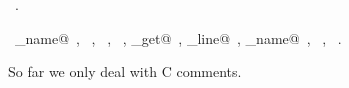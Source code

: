 \documentclass[a4paper]{report}
\begin{document}
\begin{flushleft}
\begin{minipage}{\linewidth}
\begin{list}{}{}
\mbox{}\verb@}@{\NWsep}
\end{list}
\vspace{-1.5ex}
\footnotesize
\begin{list}{}{\setlength{\itemsep}{-\parsep}\setlength{\itemindent}{-\leftmargin}}
\item \NWtxtMacroRefIn\ .
\item \NWtxtIdentsUsed\nobreak\  \verb@command_name@\nobreak\ , \verb@FALSE@\nobreak\ , \verb@fprintf@\nobreak\ , \verb@isspace@\nobreak\ , \verb@source_get@\nobreak\ , \verb@source_line@\nobreak\ , \verb@source_name@\nobreak\ , \verb@stderr@\nobreak\ , \verb@TRUE@\nobreak\ .
\item{}
\end{list}
\end{minipage}\vspace{4ex}
\end{flushleft}
So far we only deal with C comments.
\end{document}
